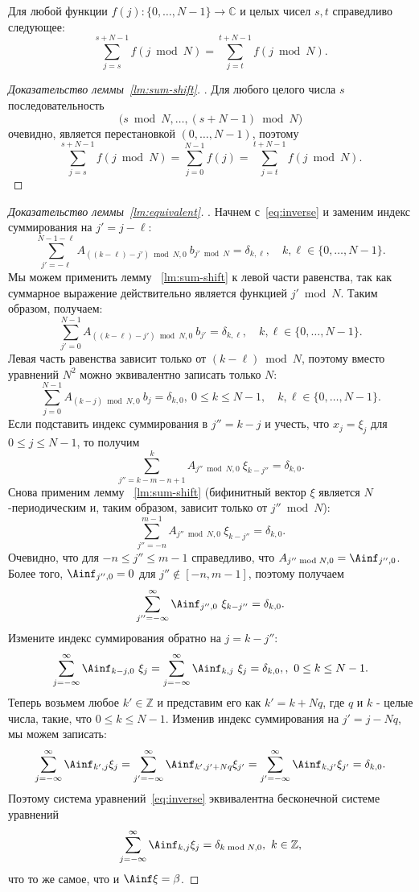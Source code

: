 \begin{lemma}\label{lm:sum-shift}
	Для любой функции $f(j):\{0,\dots,N-1\}\to \mathbb{C}$ и целых чисел $s,t$ справедливо следующее:
	\[
	\sum_{j=s}^{s+N-1} f(j \bmod N) = \sum_{j=t}^{t+N-1} f(j \bmod N).
	\]
\end{lemma}
\begin{proof}[Доказательство леммы~\ref{lm:sum-shift}].
	Для любого целого числа $s$ последовательность
	\[
	\Big(s \bmod N, \dots, (s+N-1) \bmod N\Big)
	\]
	очевидно, является перестановкой $(0,\dots, N-1)$, поэтому
	\[
	\sum_{j=s}^{s+N-1} f(j \bmod N) = \sum_{j=0}^{N-1} f(j) = \sum_{j=t}^{t+N-1} f(j \bmod N).
	\]
\end{proof}
\begin{proof}[Доказательство леммы~\ref{lm:equivalent}].
	Начнем с~\eqref{eq:inverse} и заменим индекс суммирования на $j' = j - \ell$:
	\[
	\sum_{j'=-\ell}^{N-1-\ell} A_{((k-\ell)- j') \bmod N, 0}~b_{j'\bmod N}
	=
	\delta_{k,\ell},\quad k,\ell \in \{0, \dots, N-1\}.
	\]
	Мы можем применить лемму ~\ref{lm:sum-shift} к левой части равенства, так как суммарное выражение действительно является функцией $j' \bmod N$.
	Таким образом, получаем:
	\[
	\sum_{j'=0}^{N-1} A_{((k-\ell)- j') \bmod N, 0}~b_{j'}
	=
	\delta_{k,\ell},\quad k,\ell \in \{0, \dots, N-1\}.
	\]
	Левая часть равенства зависит только от $(k-\ell) \bmod N$, поэтому вместо уравнений $N^2$ можно эквивалентно записать только $N$:
	\[
	\sum_{j=0}^{N-1} A_{(k-j) \bmod N, 0}~b_j
	=
	\delta_{k,0},~ 0\le k \le N-1,\quad k,\ell \in \{0, \dots, N-1\}.
	\]
	Если подставить индекс суммирования в $j'' = k-j$ и учесть, что $x_j = \xi_{j}$ для $0\le j \le N-1$, то получим
	\[
	\sum_{j''=k-m-n+1}^{k} A_{j'' \bmod N, 0}~\xi_{k-j''} = \delta_{k,0}.
	\]
	Снова применим лемму ~\ref{lm:sum-shift} (бифинитный вектор $\xi$ является $N$-периодическим и, таким образом, зависит только от $j'' \bmod N$):
	\[
	\sum_{j''=-n}^{m-1}A_{j'' \bmod N, 0}~\xi_{k-j''} = \delta_{k,0}.
	\]
	Очевидно, что для $-n \le j'' \le m-1$ справедливо, что $A_{j'' \bmod N,0} = \Ainf_{j'', 0}$.
	Более того, $\Ainf_{j'', 0} = 0$ для $j'' \not\in [-n,m-1]$, поэтому получаем
	\[
	\sum_{j''=-\infty}^{\infty}\Ainf_{j'',0}~\xi_{k-j''} = \delta_{k,0}.
	\]
	Измените индекс суммирования обратно на $j = k-j''$:
	\[
	\sum_{j=-\infty}^{\infty}\Ainf_{k-j,0}~\xi_{j}
	=
	\sum_{j=-\infty}^{\infty}\Ainf_{k,j}~\xi_{j}
	=
	\delta_{k,0},
	,~ 0\le k \le N-1.
	\]
	Теперь возьмем любое $k' \in \mathbb{Z}$ и представим его как $k' = k + Nq$, где $q$ и $k$ - целые числа, такие, что $0 \le k \le N-1$.
	Изменив индекс суммирования на $j' = j - Nq$, мы можем записать:
	\[
	\sum_{j=-\infty}^{\infty}\Ainf_{k',j}\xi_{j}
	=
	\sum_{j'=-\infty}^{\infty}\Ainf_{k',j'+Nq}\xi_{j'}
	=
	\sum_{j'=-\infty}^{\infty}\Ainf_{k,j'}\xi_{j'}
	=
	\delta_{k,0}.
	\]
	Поэтому система уравнений~\eqref{eq:inverse} эквивалентна бесконечной системе уравнений
	\[
	\sum_{j=-\infty}^{\infty}\Ainf_{k,j}\xi_{j} = \delta_{k\bmod N,0},~k\in\mathbb{Z},
	\]
	что то же самое, что и $\Ainf\xi = \beta$.
\end{proof}

